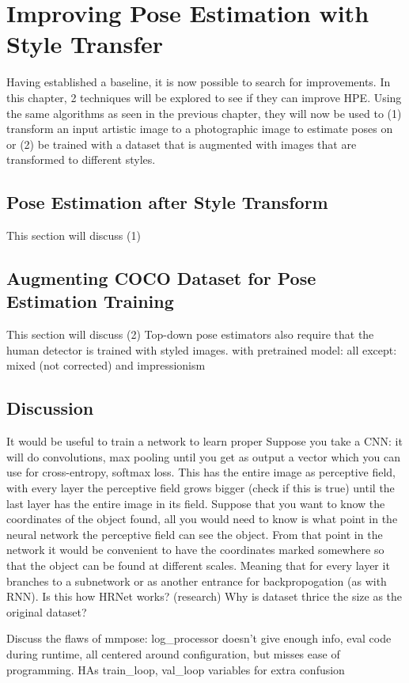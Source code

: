 \chapter{Improving Pose Estimation with Style Transfer}
\label{chap:improvements}
Having established a baseline, it is now possible to search for improvements.
In this chapter, 2 techniques will be explored to see if they can improve \gls{HPE}.
Using the same algorithms as seen in the previous chapter, they will now be used to
(1) transform an input artistic image to a photographic image to estimate poses on or
(2) be trained with a dataset that is augmented with images that are transformed to different styles.

\section{Pose Estimation after Style Transform}
This section will discuss (1)

\section{Augmenting COCO Dataset for Pose Estimation Training}
This section will discuss (2)
Top-down pose estimators also require that the human detector is trained with styled images.
with pretrained model: all except: mixed (not corrected) and impressionism

\section{Discussion}
It would be useful to train a network to learn proper 
Suppose you take a \gls{CNN}: it will do convolutions, max pooling until you get as output a vector which you can use for cross-entropy, softmax loss.
This has the entire image as perceptive field, with every layer the perceptive field grows bigger (check if this is true) until the last layer has the entire image in its field.
Suppose that you want to know the coordinates of the object found, all you would need to know is what point in the neural network the perceptive field can see the object.
From that point in the network it would be convenient to have the coordinates marked somewhere so that the object can be found at different scales.
Meaning that for every layer it branches to a subnetwork or as another entrance for backpropogation (as with RNN).
Is this how HRNet works? (research)
Why is dataset thrice the size as the original dataset?

Discuss the flaws of mmpose: log_processor doesn't give enough info, eval code during runtime, all centered around configuration, but misses ease of programming.
HAs train_loop, val_loop variables for extra confusion
